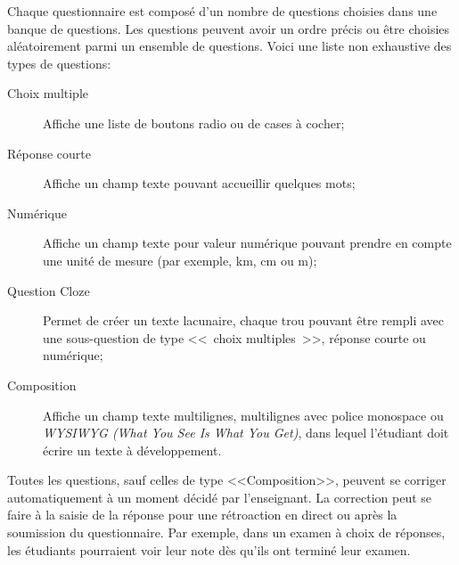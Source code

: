 Chaque questionnaire est compos\'e d'un nombre de questions choisies dans une banque de questions.
Les questions peuvent avoir un ordre pr\'ecis ou \^etre choisies al\'eatoirement parmi un ensemble de questions.
Voici une liste non exhaustive des types de questions:
\begin{description}
  \item[Choix multiple]
  
  Affiche une liste de boutons radio ou de cases \`a cocher;
  
  \item[R\'eponse courte]
  
  Affiche un champ texte pouvant accueillir quelques mots;
  
  \item[Num\'erique]
  
  Affiche un champ texte pour valeur num\'erique pouvant prendre en compte une unit\'e de mesure (par exemple, km, cm ou m);
  
  \item[Question Cloze]
  
  Permet de cr\'eer un texte lacunaire, chaque \og trou \fg{} pouvant \^etre rempli avec une sous-question de type <<~choix multiples~>>, r\'eponse courte ou num\'erique;
  
  \item[Composition]
  
  Affiche un champ texte multilignes, multilignes avec police monospace ou \textit{WYSIWYG (What You See Is What You Get)}, dans lequel
  l'\'etudiant doit \'ecrire un texte \`a d\'eveloppement.
\end{description}
Toutes les questions, sauf celles de type <<Composition>>, peuvent se corriger automatiquement \`a un moment d\'ecid\'e par l'enseignant.
La correction peut se faire \`a la saisie de la r\'eponse pour une r\'etroaction en direct ou apr\`es la soumission du questionnaire.
Par exemple, dans un examen \`a choix de r\'eponses, les \'etudiants pourraient voir leur note d\`es qu'ils ont termin\'e leur examen.

\medskip

